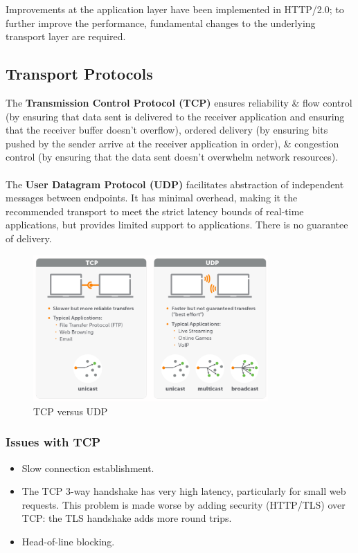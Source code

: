 \documentclass[a4paper,11pt]{article}
\begin{document}
Improvements at the application layer have been implemented in HTTP/2.0;
to further improve the performance, fundamental changes to the underlying transport layer are required.

\subsection{Transport Protocols}
The \textbf{Transmission Control Protocol (TCP)} ensures reliability \& flow control (by ensuring that data sent is delivered to the receiver application and ensuring that the receiver buffer doesn't overflow), ordered delivery (by ensuring bits pushed by the sender arrive at the receiver application in order), \& congestion control (by ensuring that the data sent doesn't overwhelm network resources).
\\\\
The \textbf{User Datagram Protocol (UDP)} facilitates abstraction of independent messages between endpoints.
It has minimal overhead, making it the recommended transport to meet the strict latency bounds of real-time applications, but provides limited support to applications.
There is no guarantee of delivery.

\begin{figure}[H]
    \centering
    \includegraphics[width=0.8\textwidth]{./images/tcpvsudp.png}
    \caption{TCP versus UDP}
\end{figure}

\subsubsection{Issues with TCP}
\begin{itemize}
    \item   Slow connection establishment.
    \item   The TCP 3-way handshake has very high latency, particularly for small web requests.
            This problem is made worse by adding security (HTTP/TLS) over TCP: the TLS handshake adds more round trips.
    \item   Head-of-line blocking.
\end{itemize}
\end{document}
